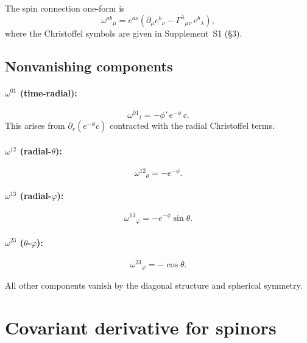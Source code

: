 \documentclass[11pt,letterpaper]{article}
\numberwithin{equation}{section}
\begin{document}
The spin connection one-form is
\begin{equation}
  \omega^{ab}{}_\mu = e^{a\nu}\!\left(\partial_\mu e^b{}_\nu
    - \Gamma^\lambda{}_{\mu\nu}\,e^b{}_\lambda\right),
\end{equation}
where the Christoffel symbols are given in Supplement~S1 (\S3).

\subsection{Nonvanishing components}

\paragraph{$\omega^{01}$ (time-radial):}
\begin{equation}
\label{eq:omega01}
  \omega^{01}{}_t = -\phi'\,e^{-\phi}\,c.
\end{equation}
This arises from $\partial_r(e^{-\phi}c)$ contracted with the radial Christoffel
terms.

\paragraph{$\omega^{12}$ (radial-$\theta$):}
\begin{equation}
\label{eq:omega12}
  \omega^{12}{}_\theta = -e^{-\phi}.
\end{equation}

\paragraph{$\omega^{13}$ (radial-$\varphi$):}
\begin{equation}
\label{eq:omega13}
  \omega^{13}{}_\varphi = -e^{-\phi}\sin\theta.
\end{equation}

\paragraph{$\omega^{23}$ ($\theta$-$\varphi$):}
\begin{equation}
\label{eq:omega23}
  \omega^{23}{}_\varphi = -\cos\theta.
\end{equation}

All other components vanish by the diagonal structure and spherical symmetry.

\section{Covariant derivative for spinors}
\label{sec:spinor_deriv}
\end{document}
